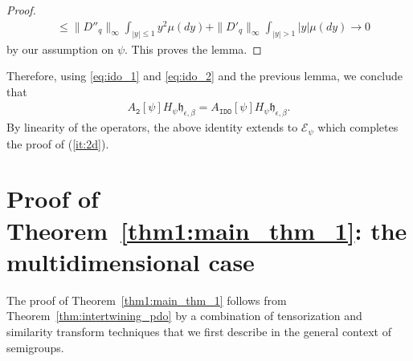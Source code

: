 \documentclass[12pt]{amsart}
\newcommand{\hlabel}{\phantomsection\label}
\numberwithin{equation}{section}
\newcommand{\cc}{\mathcal}
\renewcommand{\le}{\leqslant}
\newcommand{\mf}{\mathfrak}
\newcommand{\ttt}{\mathtt}
\newcommand{\Hpsi}{H_\psi}
\newcommand{\eps}{\epsilon}
\newcommand{\heb}{\mf{h}_{\eps,\beta}}
\theoremstyle{definition}
\theoremstyle{assump}
\theoremstyle{remark}
\begin{document}
{\begin{proof}
\begin{equation*}
\begin{aligned}
&\le \|D''_q\|_{\infty}\int_{|y|\le 1} y^2\mu(dy)+\|D'_q\|_\infty\int_{|y|>1} |y|\mu(dy)\to 0
\end{aligned}
\end{equation*}
by our assumption on $\psi$. This proves the lemma.
\end{proof}
Therefore, using \eqref{eq:ido_1} and \eqref{eq:ido_2} and the previous lemma, we conclude that
\begin{align*}
A_\ttt{2}[\psi]\Hpsi\heb=A_\ttt{IDO}[\psi]\Hpsi\heb.
\end{align*}
By linearity of the operators, the above identity extends to $\cc{E}_\psi$ which completes the proof of (\ref{it:2d}).

\section{Proof of Theorem~\ref{thm1:main_thm_1}: the multidimensional case}\hlabel{sec:proof2}
The proof of  Theorem~\ref{thm1:main_thm_1}  follows from Theorem~\ref{thm:intertwining_pdo} by a combination of tensorization and similarity transform techniques that we first describe in the general context of semigroups.
}
\end{document}
